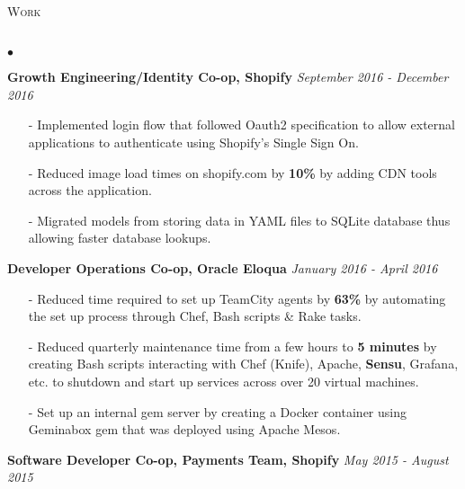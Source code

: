 \documentclass[11pt]{article}
\newcommand{\lineunder}{\vspace*{-8pt} \\ \hspace*{-18pt} \hrulefill \\}
\newcommand{\header}[1]{{\hspace*{-15pt}\vspace*{6pt} \textsc{#1}} \vspace*{-6pt} \lineunder }
\newenvironment{achievements}{\begin{list}{$\bullet$}{\topsep 0pt \itemsep -1.5pt \leftmargin 5pt}}{\vspace*{4pt}\end{list}}
\begin{document}
\header{\fontsize{11.1}{10}\selectfont Work}
\begin{achievements}

\item \textbf{{\fontsize{9.5}{10}\selectfont Growth Engineering/Identity Co-op, Shopify}} \hfill \textit {September 2016 - December 2016}


\begin{itemize}
\item[-] Implemented login flow that followed Oauth2 specification to allow external applications to authenticate using Shopify’s Single Sign On.
\vspace{2pt}
\item[-] Reduced image load times on shopify.com by \textbf{10\%} by adding CDN tools across the application.
\vspace{2pt}
\item[-] Migrated models from storing data in YAML files to SQLite database thus allowing faster database lookups.
\end{itemize}
\vspace{4pt}

\item \textbf{{\fontsize{9.5}{10}\selectfont  Developer Operations Co-op, Oracle Eloqua}} \hfill \textit {January 2016 - April 2016}


\begin{itemize}
\item[-]Reduced time required to set up TeamCity agents by \textbf{63\%} by automating the set up process through Chef, Bash scripts \& Rake tasks.
\vspace{2pt}
\item[-]Reduced quarterly maintenance time from a few hours to \textbf{5 minutes} by creating Bash scripts interacting with Chef (Knife), Apache, \textbf{Sensu}, Grafana, etc. to shutdown and start up services across over 20 virtual machines.
\vspace{2pt}
\item[-]Set up an internal gem server by creating a Docker container using Geminabox gem that was deployed using Apache Mesos.
\end{itemize}
\vspace{4pt}
\item \textbf{{\fontsize{9.5}{10}\selectfont Software Developer Co-op, Payments Team, Shopify}} \hfill \textit {May 2015 - August 2015}


\end{achievements}
\end{document}
